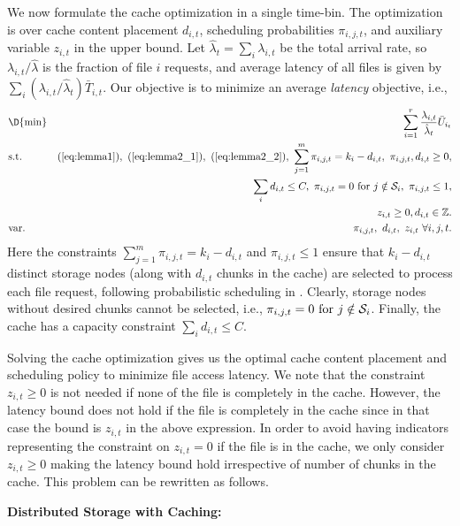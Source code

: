 We now formulate the cache optimization in a single time-bin. The optimization is over cache content placement $d_{i,t}$, scheduling probabilities $\pi_{i,j,t}$, and auxiliary variable $z_{i,t}$ in the upper bound. Let $\hat{\lambda}_t=\sum_i \lambda_{i,t}$ be the total arrival rate, so $\lambda_{i,t}/\hat{\lambda}$ is the fraction of file $i$ requests, and average latency of all files is given by $\sum_i (\lambda_{i,t}/\hat{\lambda}_t)\bar{T}_{i,t}$. Our objective is to minimize an average {\em latency} objective, i.e.,
\vspace{-0.1in}
\begin{eqnarray}
& \D {\rm min} & \sum_{i=1}^r \frac{\lambda_{i,t}}{\hat{\lambda}_t}  \bar{U}_{i_t}  \label{eq:JLRM-SC}\\
& {\rm s.t.} &  (\ref{eq:lemma1}), \ (\ref{eq:lemma2_1}), \ (\ref{eq:lemma2_2}), \  \sum_{j=1}^{m}\pi_{i,j,t} = k_i - d_{i,t}, \  \pi_{i,j,t}, d_{i,t}\ge 0, \nonumber\\ && \sum_i d_{i,t}\le C, \  \pi_{i,j,t} = 0 \text{ for } j\notin {\cal S}_i, \  \pi_{i,j,t}\le 1, \nonumber\\
&&z_{i,t}\ge 0,  d_{i,t} \in {\mathbb Z}.  \label{eq:JLRM-SC2}   \nonumber \\
& {\rm var.} &  \pi_{i,j,t}, \ d_{i,t}, \ z_{i,t} \ \forall i,j,t. \nonumber
\end{eqnarray}
Here the constraints  $\sum_{j=1}^{m}\pi_{i,j,t} = k_i - d_{i,t}$ and $\pi_{i,j,t}\le 1$ ensure that  $k_i - d_{i,t}$ distinct storage nodes (along with $d_{i,t}$ chunks in the cache) are selected to process each file request, following probabilistic scheduling in \cite{Yu_TON}. Clearly, storage nodes without desired chunks cannot be selected, i.e., $\pi_{i,j,t} = 0 \text{ for } j\notin {\cal S}_i$. Finally, the cache has a capacity constraint $\sum_i d_{i,t}\le C$.

Solving the cache optimization gives us the optimal cache content placement and scheduling policy to minimize file access latency. We note that the constraint $z_{i,t}\ge 0$ is not needed if none of the file is completely in the cache. However, the latency bound does not hold if the file is completely in the cache since in that case the bound is $z_{i,t}$ in the above expression. In order to avoid having indicators representing the constraint on $z_{i,t}=0$ if the file is in the cache, we only consider $z_{i,t}\ge 0$ making the latency bound hold irrespective of number of chunks in the cache.  This problem can be rewritten as follows.


\noindent \hspace{0.2in} {\bf Distributed Storage with Caching:}

